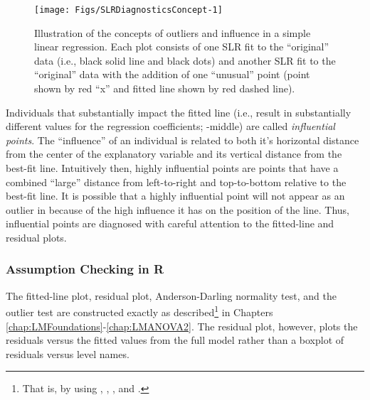 \documentclass[10pt,openany]{book}\usepackage[]{graphicx}\usepackage[]{color}
\newenvironment{knitrout}{}{} %
\begin{document}
\begin{knitrout}
\color{fgcolor}\begin{figure}[h]

{\centering \texttt{[image: Figs/SLRDiagnosticsConcept-1]} 

}

\caption[Illustration of the concepts of outliers and influence in a simple linear regression]{Illustration of the concepts of outliers and influence in a simple linear regression.  Each plot consists of one SLR fit to the ``original'' data (i.e., black solid line and black dots) and another SLR fit to the ``original'' data with the addition of one ``unusual'' point (point shown by red ``x'' and fitted line shown by red dashed line).}\label{fig:SLRDiagnosticsConcept}
\end{figure}


\end{knitrout}
\vspace{9pt}
Individuals that substantially impact the fitted line (i.e., result in substantially different values for the regression coefficients; -middle) are called \emph{influential points}.  The ``influence'' of an individual is related to both it's horizontal distance from the center of the explanatory variable and its vertical distance from the best-fit line.  Intuitively then, highly influential points are points that have a combined ``large'' distance from left-to-right and top-to-bottom relative to the best-fit line.  It is possible that a highly influential point will not appear as an outlier in  because of the high influence it has on the position of the line.  Thus, influential points are diagnosed with careful attention to the fitted-line and residual plots.


\subsubsection*{Assumption Checking in R}
The fitted-line plot, residual plot, Anderson-Darling normality test, and the outlier test are constructed exactly as described\footnote{That is, by using , , , and .} in Chapters \ref{chap:LMFoundations}-\ref{chap:LMANOVA2}.  The residual plot, however, plots the residuals versus the fitted values from the full model rather than a boxplot of residuals versus level names.
\end{document}
